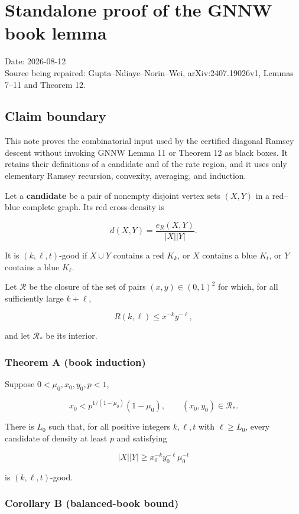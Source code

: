 \section{Standalone proof of the GNNW book lemma}

Date: 2026-08-12\\
Source being repaired: Gupta--Ndiaye--Norin--Wei, arXiv:2407.19026v1,
Lemmas 7--11 and Theorem 12.

\subsection{Claim boundary}

This note proves the combinatorial input used by the certified diagonal
Ramsey descent without invoking GNNW Lemma 11 or Theorem 12 as black
boxes. It retains their definitions of a candidate and of the rate
region, and it uses only elementary Ramsey recursion, convexity,
averaging, and induction.

Let a \textbf{candidate} be a pair of nonempty disjoint vertex sets
\((X,Y)\) in a red--blue complete graph. Its red cross-density is

\[
d(X,Y)=\frac{e_R(X,Y)}{|X||Y|}.
\]

It is \((k,\ell,t)\)-good if \(X\cup Y\) contains a red \(K_k\), or
\(X\) contains a blue \(K_t\), or \(Y\) contains a blue \(K_\ell\).

Let \(\mathcal R\) be the closure of the set of pairs
\((x,y)\in(0,1)^2\) for which, for all sufficiently large \(k+\ell\),

\[
R(k,\ell)\le x^{-k}y^{-\ell},
\]

and let \(\mathcal R_*\) be its interior.

\subsubsection{Theorem A (book induction)}

Suppose \(0<\mu_0,x_0,y_0,p<1\),

\[
x_0<p^{1/(1-\mu_0)}(1-\mu_0),
\qquad (x_0,y_0)\in\mathcal R_*.
\tag{A.1}
\]

There is \(L_0\) such that, for all positive integers \(k,\ell,t\) with
\(\ell\ge L_0\), every candidate of density at least \(p\) and
satisfying

\[
|X||Y|\ge x_0^{-k}y_0^{-\ell}\mu_0^{-t}
\tag{A.2}
\]

is \((k,\ell,t)\)-good.

\subsubsection{Corollary B (balanced-book bound)}

